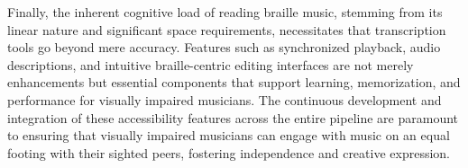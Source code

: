 Finally, the inherent cognitive load of reading braille music, stemming from its linear nature and significant space requirements, necessitates that transcription tools go beyond mere accuracy. Features such as synchronized playback, audio descriptions, and intuitive braille-centric editing interfaces are not merely enhancements but essential components that support learning, memorization, and performance for visually impaired musicians. The continuous development and integration of these accessibility features across the entire pipeline are paramount to ensuring that visually impaired musicians can engage with music on an equal footing with their sighted peers, fostering independence and creative expression.
